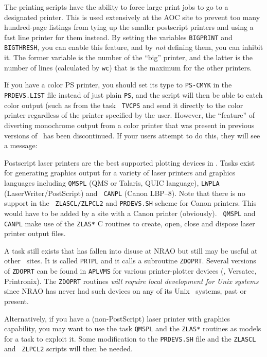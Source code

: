 The printing scripts have the ability to force large print jobs to go to
a designated printer.  This is used extensively at the AOC site to
prevent too many hundred-page listings from tying up the smaller
postscript printers and using a fast line printer for them instead.  By
setting the variables {\tt BIGPRINT} and {\tt BIGTHRESH}, you can enable
this feature, and by {\it not\/} defining them, you can inhibit it.  The
former variable is the number of the ``big'' printer, and the latter is
the number of lines (calculated by {\tt wc}) that is the maximum for the
other printers.

If you have a color PS printer, you should set its type to {\tt PS-CMYK}
in the {\tt PRDEVS.LIST} file instead of just plain {\tt PS}, and the
script will then be able to catch color output (such as from the task {\tt
TVCPS} and send it directly to the color printer regardless of the printer
specified by the user.  However, the ``feature'' of diverting monochrome
output from a color printer that was present in previous versions of
\AIPS\ has been discontinued.  If your users attempt to do this, they will
see a message:\medskip

\medskip

\noindent
Postscript laser printers are the best supported plotting devices in
\AIPS.  Tasks exist for generating graphics output for a variety of
laser printers and graphics languages including {\tt QMSPL} (QMS or
Talaris, QUIC language), {\tt LWPLA} (LaserWriter/PostScript) and {\tt
CANPL} (Canon LBP--8).  Note that there is no support in the {\tt
ZLASCL/ZLPCL2} and {\tt PRDEVS.SH} scheme for Canon printers.  This
would have to be added by a site with a Canon printer (obviously).  {\tt
QMSPL} and {\tt CANPL} make use of the {\tt ZLAS*} C routines to create,
open, close and dispose laser printer output files.

A task still exists that has fallen into disuse at NRAO but still may be
useful at other \AIPS\ sites.  It is called {\tt PRTPL} and it calls a
subroutine {\tt ZDOPRT}.  Several versions of {\tt ZDOPRT} can be found
in {\tt\dol APLVMS} for various printer-plotter devices (\eg, Versatec,
Printronix).  The {\tt ZDOPRT} routines {\it will require local
development for Unix systems\/} since NRAO has never had such devices on
any of its Unix \AIPS\ systems, past or present.

Alternatively, if you have a (non-PostScript) laser printer with
graphics capability, you may want to use the task {\tt QMSPL} and the
{\tt ZLAS*} routines as models for a task to exploit it.  Some
modification to the {\tt PRDEVS.SH} file and the {\tt ZLASCL} and {\tt
ZLPCL2} scripts will then be needed.  \medskip

